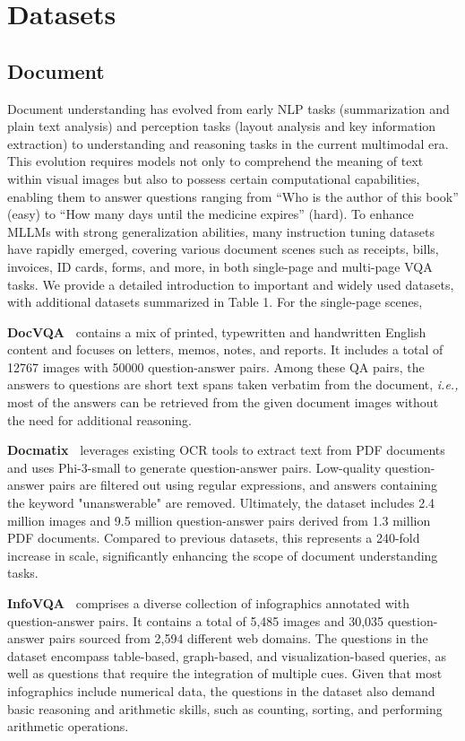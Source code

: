 \section{Datasets}

\subsection{Document}
Document understanding has evolved from early NLP tasks (summarization and plain text analysis) and perception tasks (layout analysis and key information extraction) to understanding and reasoning tasks in the current multimodal era. This evolution requires models not only to comprehend the meaning of text within visual images but also to possess certain computational capabilities, enabling them to answer questions ranging from ``Who is the author of this book'' (easy) to ``How many days until the medicine expires'' (hard). To enhance MLLMs with strong generalization abilities, many instruction tuning datasets have rapidly emerged, covering various document scenes such as receipts, bills, invoices, ID cards, forms, and more, in both single-page and multi-page VQA tasks. We provide a detailed introduction to important and widely used datasets, with additional datasets summarized in Table 1. 
For the single-page scenes, 

\noindent \textbf{DocVQA~\cite{mathew2021docvqa}} contains a mix of printed, typewritten and handwritten English content and focuses on letters, memos, notes, and reports. It includes a total of 12767 images with  50000 question-answer pairs. Among these QA pairs, the answers to questions are short text spans taken verbatim from the document, \emph{i.e.,} most of the answers can be retrieved from the given document images without the need for additional reasoning.

\noindent \textbf{Docmatix~\cite{laurenccon2024building}} leverages existing OCR tools to extract text from PDF documents and uses Phi-3-small to generate question-answer pairs. Low-quality question-answer pairs are filtered out using regular expressions, and answers containing the keyword "unanswerable" are removed. Ultimately, the dataset includes 2.4 million images and 9.5 million question-answer pairs derived from 1.3 million PDF documents. Compared to previous datasets, this represents a 240-fold increase in scale, significantly enhancing the scope of document understanding tasks.

\noindent \textbf{InfoVQA~\cite{mathew2022infographicvqa}} comprises a diverse collection of infographics annotated with question-answer pairs. It contains a total of 5,485 images and 30,035 question-answer pairs sourced from 2,594 different web domains. The questions in the dataset encompass table-based, graph-based, and visualization-based queries, as well as questions that require the integration of multiple cues. Given that most infographics include numerical data, the questions in the dataset also demand basic reasoning and arithmetic skills, such as counting, sorting, and performing arithmetic operations.

